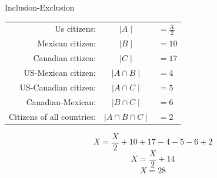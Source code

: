 \documentclass{beamer}
\begin{document}
\begin{frame}{Inclusion-Exclusion}
    \centering
    \begin{tabular}{r c l}
    Us citizens:                & $\mid A \mid$                & $= \frac{X}{2}$    \\
    Mexican citizen:            & $\mid B \mid$                & $= 10$             \\
    Canadian citizen:           & $\mid C \mid$                & $= 17$             \\
    US-Mexican citizen:         & $\mid A \cap B \mid$         & $= 4$              \\
    US-Canadian citizen:        & $\mid A \cap C \mid$         & $= 5$              \\
    Canadian-Mexican:           & $\mid B \cap C \mid$         & $= 6$              \\
    Citizens of all countries:  & $\mid A \cap B \cap C \mid$  & $= 2$              \\
    \end{tabular}

    $$X = \frac{X}{2} + 10 + 17 - 4 - 5 - 6 + 2$$
    $$X = \frac{X}{2} + 14$$
    $$X = 28$$

\end{frame}
\end{document}
